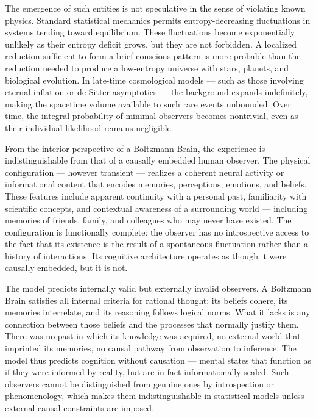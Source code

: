 The emergence of such entities is not speculative in the sense of violating known physics. Standard statistical mechanics permits entropy-decreasing fluctuations in systems tending toward equilibrium. These fluctuations become exponentially unlikely as their entropy deficit grows, but they are not forbidden. A localized reduction sufficient to form a brief conscious pattern is more probable than the reduction needed to produce a low-entropy universe with stars, planets, and biological evolution. In late-time cosmological models — such as those involving eternal inflation or de Sitter asymptotics — the background expands indefinitely, making the spacetime volume available to such rare events unbounded. Over time, the integral probability of minimal observers becomes nontrivial, even as their individual likelihood remains negligible.

From the interior perspective of a Boltzmann Brain, the experience is indistinguishable from that of a causally embedded human observer. The physical configuration — however transient — realizes a coherent neural activity or informational content that encodes memories, perceptions, emotions, and beliefs. These features include apparent continuity with a personal past, familiarity with scientific concepts, and contextual awareness of a surrounding world — including memories of friends, family, and colleagues who may never have existed. The configuration is functionally complete: the observer has no introspective access to the fact that its existence is the result of a spontaneous fluctuation rather than a history of interactions. Its cognitive architecture operates as though it were causally embedded, but it is not.

The model predicts internally valid but externally invalid observers. A Boltzmann Brain satisfies all internal criteria for rational thought: its beliefs cohere, its memories interrelate, and its reasoning follows logical norms. What it lacks is any connection between those beliefs and the processes that normally justify them. There was no past in which its knowledge was acquired, no external world that imprinted its memories, no causal pathway from observation to inference. The model thus predicts cognition without causation — mental states that function as if they were informed by reality, but are in fact informationally sealed. Such observers cannot be distinguished from genuine ones by introspection or phenomenology, which makes them indistinguishable in statistical models unless external causal constraints are imposed.

